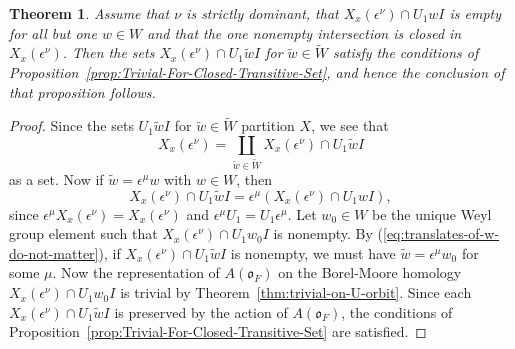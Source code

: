 \documentclass{amsart}
\newtheorem{theorem}{Theorem}
\theoremstyle{definition}
\def\O{\mathfrak{o}}
\def\e{\epsilon}
\def\W{\widetilde{W}}
\def\w{\widetilde{w}}
\def\A{A(\O_F)}
\def\en{\e^{\nu}}
\def\X{X_x(\en)}
\begin{document}
  \begin{theorem}
    \label{thm:Triviality-For-One-Closed-Intersection}
    Assume that $\nu$ is strictly dominant, that $\X \cap U_1 wI$ is empty for
    all but one $w \in W$ and that the one nonempty intersection is closed in
    $\X$.  Then the sets $\X \cap U_1 \w I$ for $\w \in \W$ satisfy the
    conditions of Proposition~\ref{prop:Trivial-For-Closed-Transitive-Set}, and
    hence the conclusion of that proposition follows.
  \end{theorem}
  \begin{proof}
    Since the sets $U_1 \w I$ for $\w \in \W$ partition $X$, we see that
    \begin{equation*}
      \X = \coprod_{\w\in\W} \X \cap U_1 \w I
    \end{equation*}
    as a set. Now if $\w = \e^\mu w$ with $w \in W$, then
    \begin{equation}
      \label{eq:translates-of-w-do-not-matter}
      \X \cap U_1 \w I = \e^\mu (\X \cap U_1 w I),
    \end{equation}
    since $\e^\mu \X = \X$ and $\e^\mu U_1 = U_1 \e^\mu$.  Let $w_0 \in W$ be
    the unique Weyl group element such that $\X \cap U_1 w_0 I$ is nonempty.
    By (\ref{eq:translates-of-w-do-not-matter}), if $\X \cap U_1 \w I$ is
    nonempty, we must have $\w = \e^\mu w_0$ for some $\mu$.  Now the
    representation of $\A$ on the Borel-Moore homology $\X \cap U_1 w_0 I$ is
    trivial by Theorem~\ref{thm:trivial-on-U-orbit}.  Since each $\X \cap U_1
    \w I$ is preserved by the action of $\A$, the conditions of
    Proposition~\ref{prop:Trivial-For-Closed-Transitive-Set} are satisfied.
  \end{proof}
\end{document}
